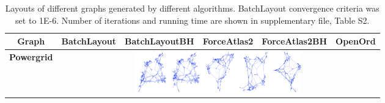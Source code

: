 \documentclass{vgtc}
\begin{document}
\begin{table}[!t]
\centering
\caption{Layouts of different graphs generated by different algorithms. BatchLayout convergence criteria was set to 1E-6. Number of iterations and running time are shown in supplementary file, Table S2.}
\label{tab:convergedlayouts}

\begin{tabular}{|c|p{2.5cm}|p{2.6cm}|p{2.6cm}|p{2.6cm}|p{2.5cm}|}
\hline
\textbf{Graph}   & \textbf{BatchLayout} & \textbf{BatchLayoutBH} & \textbf{ForceAtlas2} & \textbf{ForceAtlas2BH} & \textbf{OpenOrd} \\ \hline
        \textbf{Powergrid} & \multicolumn{5}{|c|}{\includegraphics[height=1.8cm,width=0.8\linewidth]{layouts/convergedlayouts/us_powergrid_converged.png}}                                                                                                                \\ \hline


\end{tabular}
\end{table}
\end{document}
